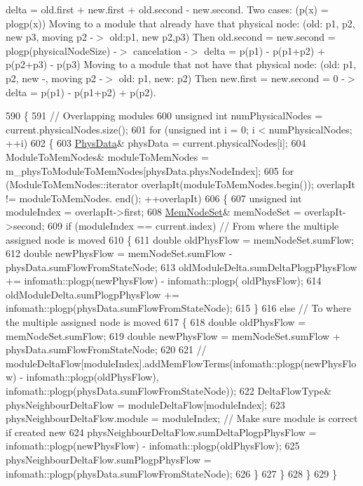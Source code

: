 delta = old.\+first + new.\+first + old.\+second -\/ new.\+second. Two cases\+: (p(x) = plogp(x)) Moving to a module that already have that physical node\+: (old\+: p1, p2, new p3, moving p2 -\/$>$ old\+:p1, new p2,p3) Then old.\+second = new.\+second = plogp(physical\+Node\+Size) -\/$>$ cancelation -\/$>$ delta = p(p1) -\/ p(p1+p2) + p(p2+p3) -\/ p(p3) Moving to a module that not have that physical node\+: (old\+: p1, p2, new -\/, moving p2 -\/$>$ old\+: p1, new\+: p2) Then new.\+first = new.\+second = 0 -\/$>$ delta = p(p1) -\/ p(p1+p2) + p(p2).
\begin{DoxyCode}
590 \{
591     \textcolor{comment}{// Overlapping modules}
600 \textcolor{comment}{}    \textcolor{keywordtype}{unsigned} \textcolor{keywordtype}{int} numPhysicalNodes = current.physicalNodes.size();
601     \textcolor{keywordflow}{for} (\textcolor{keywordtype}{unsigned} \textcolor{keywordtype}{int} i = 0; i < numPhysicalNodes; ++i)
602     \{
603         \mbox{\hyperlink{structPhysData}{PhysData}}& physData = current.physicalNodes[i];
604         ModuleToMemNodes& moduleToMemNodes = m\_physToModuleToMemNodes[physData.physNodeIndex];
605         \textcolor{keywordflow}{for} (ModuleToMemNodes::iterator overlapIt(moduleToMemNodes.begin()); overlapIt != moduleToMemNodes.
      end(); ++overlapIt)
606         \{
607             \textcolor{keywordtype}{unsigned} \textcolor{keywordtype}{int} moduleIndex = overlapIt->first;
608             \mbox{\hyperlink{structMemNodeSet}{MemNodeSet}}& memNodeSet = overlapIt->second;
609             \textcolor{keywordflow}{if} (moduleIndex == current.index) \textcolor{comment}{// From where the multiple assigned node is moved}
610             \{
611                 \textcolor{keywordtype}{double} oldPhysFlow = memNodeSet.sumFlow;
612                 \textcolor{keywordtype}{double} newPhysFlow = memNodeSet.sumFlow - physData.sumFlowFromStateNode;
613                 oldModuleDelta.sumDeltaPlogpPhysFlow += infomath::plogp(newPhysFlow) - infomath::plogp(
      oldPhysFlow);
614                 oldModuleDelta.sumPlogpPhysFlow += infomath::plogp(physData.sumFlowFromStateNode);
615             \}
616             \textcolor{keywordflow}{else} \textcolor{comment}{// To where the multiple assigned node is moved}
617             \{
618                 \textcolor{keywordtype}{double} oldPhysFlow = memNodeSet.sumFlow;
619                 \textcolor{keywordtype}{double} newPhysFlow = memNodeSet.sumFlow + physData.sumFlowFromStateNode;
620 
621                 \textcolor{comment}{// moduleDeltaFlow[moduleIndex].addMemFlowTerms(infomath::plogp(newPhysFlow) -
       infomath::plogp(oldPhysFlow), infomath::plogp(physData.sumFlowFromStateNode));}
622                 DeltaFlowType& physNeighbourDeltaFlow = moduleDeltaFlow[moduleIndex];
623                 physNeighbourDeltaFlow.module = moduleIndex; \textcolor{comment}{// Make sure module is correct if created new}
624                 physNeighbourDeltaFlow.sumDeltaPlogpPhysFlow = infomath::plogp(newPhysFlow) - 
      infomath::plogp(oldPhysFlow);
625                 physNeighbourDeltaFlow.sumPlogpPhysFlow = infomath::plogp(physData.sumFlowFromStateNode);
626             \}
627         \}
628     \}
629 \}
\end{DoxyCode}
